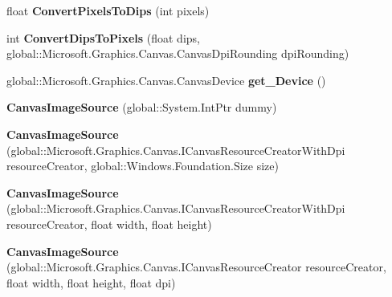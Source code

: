 \begin{DoxyCompactItemize}
float {\bfseries Convert\+Pixels\+To\+Dips} (int pixels)
\item 
\mbox{\label{class_microsoft_1_1_graphics_1_1_canvas_1_1_u_i_1_1_xaml_1_1_canvas_image_source_a5527b19721b109df85d06d449a3d6f6a}} 
int {\bfseries Convert\+Dips\+To\+Pixels} (float dips, global\+::\+Microsoft.\+Graphics.\+Canvas.\+Canvas\+Dpi\+Rounding dpi\+Rounding)
\item 
\mbox{\label{class_microsoft_1_1_graphics_1_1_canvas_1_1_u_i_1_1_xaml_1_1_canvas_image_source_aab3581e1ce35b89a948dc0025e5aaa14}} 
global\+::\+Microsoft.\+Graphics.\+Canvas.\+Canvas\+Device {\bfseries get\+\_\+\+Device} ()
\item 
\mbox{\label{class_microsoft_1_1_graphics_1_1_canvas_1_1_u_i_1_1_xaml_1_1_canvas_image_source_a274b866a61b2dc07e5c6c8ab2510ac87}} 
{\bfseries Canvas\+Image\+Source} (global\+::\+System.\+Int\+Ptr dummy)
\item 
\mbox{\label{class_microsoft_1_1_graphics_1_1_canvas_1_1_u_i_1_1_xaml_1_1_canvas_image_source_a9eb6e499e761bca49e7066fd004cac4a}} 
{\bfseries Canvas\+Image\+Source} (global\+::\+Microsoft.\+Graphics.\+Canvas.\+I\+Canvas\+Resource\+Creator\+With\+Dpi resource\+Creator, global\+::\+Windows.\+Foundation.\+Size size)
\item 
\mbox{\label{class_microsoft_1_1_graphics_1_1_canvas_1_1_u_i_1_1_xaml_1_1_canvas_image_source_a59470b76c2a432e8d723603569f5e5bf}} 
{\bfseries Canvas\+Image\+Source} (global\+::\+Microsoft.\+Graphics.\+Canvas.\+I\+Canvas\+Resource\+Creator\+With\+Dpi resource\+Creator, float width, float height)
\item 
\mbox{\label{class_microsoft_1_1_graphics_1_1_canvas_1_1_u_i_1_1_xaml_1_1_canvas_image_source_a879541668a8b03ad33dddb352363a22b}} 
{\bfseries Canvas\+Image\+Source} (global\+::\+Microsoft.\+Graphics.\+Canvas.\+I\+Canvas\+Resource\+Creator resource\+Creator, float width, float height, float dpi)

\end{DoxyCompactItemize}
